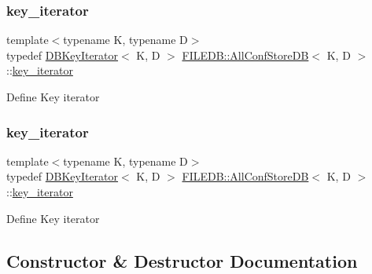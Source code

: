 \subsubsection{\texorpdfstring{key\_iterator}{key\_iterator}\hspace{0.1cm}{\footnotesize\ttfamily [2/3]}}
{\footnotesize\ttfamily template$<$typename K, typename D$>$ \\
typedef \mbox{\hyperlink{classFILEDB_1_1DBKeyIterator}{D\+B\+Key\+Iterator}}$<$ K, D $>$ \mbox{\hyperlink{classFILEDB_1_1AllConfStoreDB}{F\+I\+L\+E\+D\+B\+::\+All\+Conf\+Store\+DB}}$<$ K, D $>$\+::\mbox{\hyperlink{classFILEDB_1_1AllConfStoreDB_a2ce8981ca7049ed0c2c6e438873a9c1b}{key\+\_\+iterator}}}

Define Key iterator \mbox{\label{classFILEDB_1_1AllConfStoreDB_a2ce8981ca7049ed0c2c6e438873a9c1b}} 
\subsubsection{\texorpdfstring{key\_iterator}{key\_iterator}\hspace{0.1cm}{\footnotesize\ttfamily [3/3]}}
{\footnotesize\ttfamily template$<$typename K, typename D$>$ \\
typedef \mbox{\hyperlink{classFILEDB_1_1DBKeyIterator}{D\+B\+Key\+Iterator}}$<$ K, D $>$ \mbox{\hyperlink{classFILEDB_1_1AllConfStoreDB}{F\+I\+L\+E\+D\+B\+::\+All\+Conf\+Store\+DB}}$<$ K, D $>$\+::\mbox{\hyperlink{classFILEDB_1_1AllConfStoreDB_a2ce8981ca7049ed0c2c6e438873a9c1b}{key\+\_\+iterator}}}

Define Key iterator 

\subsection{Constructor \& Destructor Documentation}
\mbox{\label{classFILEDB_1_1AllConfStoreDB_a72b72501b29029e2bfb682565f96eac0}} 
